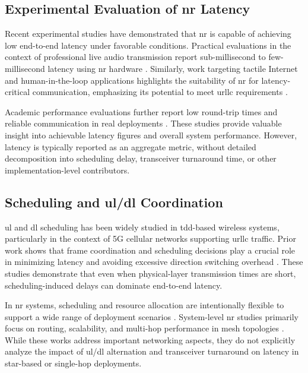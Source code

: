 \documentclass[conference]{IEEEtran}
\begin{document}
\subsection{Experimental Evaluation of \gls{nr} Latency}

Recent experimental studies have demonstrated that \gls{nr} is capable of achieving low end-to-end latency under favorable conditions. Practical evaluations in the context of professional live audio transmission report sub-millisecond to few-millisecond latency using \gls{nr} hardware \cite{dect_live_audio_latency}. Similarly, work targeting tactile Internet and human-in-the-loop applications highlights the suitability of \gls{nr} for latency-critical communication, emphasizing its potential to meet  \gls{urllc} requirements \cite{cheap_5g_dect_nr}.

Academic performance evaluations further report low round-trip times and reliable communication in real deployments \cite{silfur_dect_nr_performance,bandara_dect_nr_latency}. These studies provide valuable insight into achievable latency figures and overall system performance. However, latency is typically reported as an aggregate metric, without detailed decomposition into scheduling delay, transceiver turnaround time, or other implementation-level contributors.

\subsection{Scheduling and \gls{ul}/\gls{dl} Coordination}

\gls{ul} and \gls{dl} scheduling has been widely studied in \gls{tdd}-based wireless systems, particularly in the context of 5G cellular networks supporting  \gls{urllc} traffic. Prior work shows that frame coordination and scheduling decisions play a crucial role in minimizing latency and avoiding excessive direction switching overhead \cite{tdd_scheduling_urllc}. These studies demonstrate that even when physical-layer transmission times are short, scheduling-induced delays can dominate end-to-end latency.

In \gls{nr} systems, scheduling and resource allocation are intentionally flexible to support a wide range of deployment scenarios \cite{etsi_dect_nr_architecture}. System-level \gls{nr} studies primarily focus on routing, scalability, and multi-hop performance in mesh topologies \cite{dect_mesh_performance,near_urllc_multihop_dect}. While these works address important networking aspects, they do not explicitly analyze the impact of \gls{ul}/\gls{dl} alternation and transceiver turnaround on latency in star-based or single-hop deployments.
\end{document}
